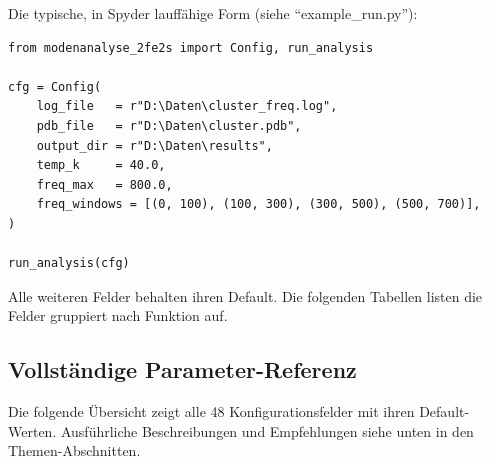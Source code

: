 \documentclass[11pt,a4paper,twoside]{article}
\theoremstyle{remark}
\begin{document}
Die typische, in Spyder lauff\"ahige Form (siehe ``example\_run.py''):

\begin{lstlisting}[style=python]
from modenanalyse_2fe2s import Config, run_analysis

cfg = Config(
    log_file   = r"D:\Daten\cluster_freq.log",
    pdb_file   = r"D:\Daten\cluster.pdb",
    output_dir = r"D:\Daten\results",
    temp_k     = 40.0,
    freq_max   = 800.0,
    freq_windows = [(0, 100), (100, 300), (300, 500), (500, 700)],
)

run_analysis(cfg)
\end{lstlisting}

Alle weiteren Felder behalten ihren Default. Die folgenden Tabellen
listen die Felder gruppiert nach Funktion auf.

\subsection{Vollst\"andige Parameter-Referenz}
\label{sec:param-referenz}

Die folgende \"Ubersicht zeigt alle 48 Konfigurationsfelder mit ihren
Default-Werten. Ausf\"uhrliche Beschreibungen und Empfehlungen siehe
unten in den Themen-Abschnitten.
\end{document}
